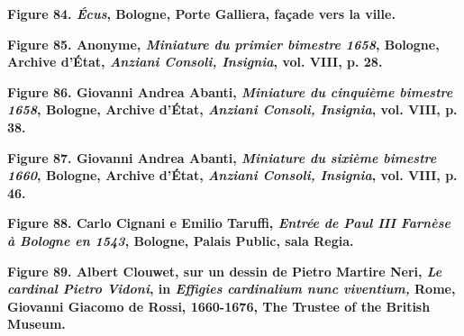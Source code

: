 \documentclass[12pt,twoside,openany]{book}
\begin{document}
\begin{center}
\par\small \textbf{Figure 84.\textit{ Écus}, Bologne, Porte Galliera, façade vers la ville.}
\end{center}

\begin{center}
\par\small \textbf{Figure 85. Anonyme, \textit{Miniature du primier bimestre 1658}, Bologne, Archive d’État, \textit{Anziani Consoli, Insignia}, vol. VIII, p. 28.}
\end{center}

\begin{center}
\par\small \textbf{Figure 86. Giovanni Andrea Abanti, \textit{Miniature du cinquième bimestre 1658}, Bologne, Archive d’État, \textit{Anziani Consoli, Insignia}, vol. VIII, p. 38.}
\end{center}

\begin{center}
\par\small \textbf{Figure 87. Giovanni Andrea Abanti, \textit{Miniature du sixième bimestre 1660}, Bologne, Archive d’État, \textit{Anziani Consoli, Insignia}, vol. VIII, p. 46.}
\end{center}

\begin{center}
\par\small \textbf{Figure 88. Carlo Cignani e Emilio Taruffi, \textit{Entrée de Paul III Farnèse à Bologne en 1543}, Bologne, Palais Public, sala Regia.}
\end{center}

\begin{center}
\par\small \textbf{Figure 89. Albert Clouwet, sur un dessin de Pietro Martire Neri, \textit{Le cardinal Pietro Vidoni}, in \textit{Effigies cardinalium nunc viventium, }Rome, Giovanni Giacomo de Rossi, 1660-1676, The Trustee of the British Museum.}
\end{center}
\end{document}
